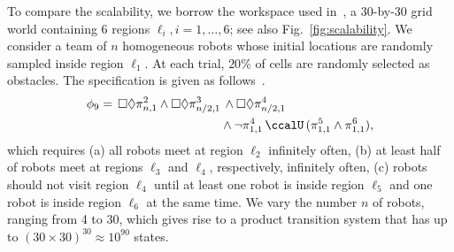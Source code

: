 \documentclass[Afour,sageh,times]{sagej}
\renewcommand{\ap}[3]{\mathcal{\pi}_{{#1},{#2}}^{#3}}
\begin{document}
{{To compare the scalability, we borrow the workspace used in~\cite{sahin2019multi}, a 30-by-30 grid world containing 6 regions $\ell_i, i=1,\ldots,6$; see also Fig.~\ref{fig:scalability}. We consider a team of $n$ homogeneous robots whose initial locations are randomly sampled inside region $\ell_1$. At each trial, $20\%$ of cells are randomly selected as obstacles. The specification is given as follows~\citep{sahin2019multi}.
\begin{align*}
  \phi_9 = \,   \square \lozenge \ap{n}{1}{2} \wedge   \square \lozenge \ap{n/2}{1}{3} &\,\wedge \square \lozenge \ap{n/2}{1}{4} \\
  & \wedge \neg \ap{1}{1}{4} \,\ccalU\, (\ap{1}{1}{5} \wedge \ap{1}{1}{6}),
\end{align*}
which requires (a) all robots meet at region $\ell_2$ infinitely often, (b) at least half of robots meet at regions $\ell_3$ and $\ell_4$, respectively, infinitely often, (c) robots should not visit region $\ell_4$ until at least one robot is inside region $\ell_5$ and one robot is inside region $\ell_6$ at the same time. We vary the number $n$ of robots, ranging from 4 to 30, which gives rise to a product transition system that has up to $(30\times30)^{30}  \approx 10^{90}$ states.

}}
\end{document}
